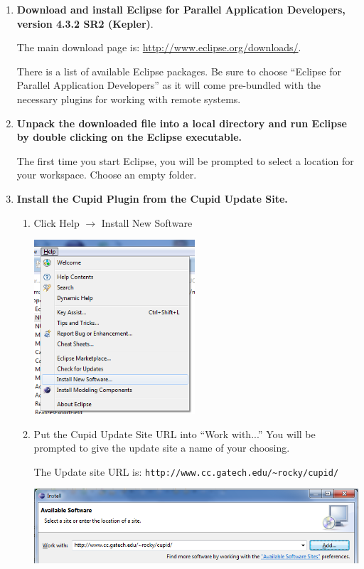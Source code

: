 \documentclass[oneside,11pt]{memoir}
\begin{document}
\begin{enumerate}

\item \textbf{Download and install Eclipse for Parallel Application Developers, version 4.3.2 SR2 (Kepler)}.

The main download page is: \href{http://www.eclipse.org/downloads/}{http://www.eclipse.org/downloads/}.  

There is a list of available Eclipse packages.  Be sure to choose ``Eclipse for Parallel Application Developers'' as it will come pre-bundled with the necessary plugins for working with remote systems.

\item \textbf{Unpack the downloaded file into a local directory and run Eclipse by double clicking on the Eclipse executable.}

The first time you start Eclipse, you will be prompted to select a location for your workspace.  Choose an empty folder.

\item \textbf{Install the Cupid Plugin from the Cupid Update Site.}

\begin{enumerate}
\itemsep2em

\item Click Help $\rightarrow$ Install New Software

\parbox{\linewidth}{\centering
  \includegraphics[width=6cm]{figs/install_fig1.png}
}

\item Put the Cupid Update Site URL into ``Work with...''  You will be prompted to give the update site a name of your choosing.

The Update site URL is:  \texttt{http://www.cc.gatech.edu/\textasciitilde{}rocky/cupid/}

\parbox{\linewidth}{\centering
  \includegraphics{figs/install_fig2.png}
}


\end{enumerate}
\end{enumerate}
\end{document}
